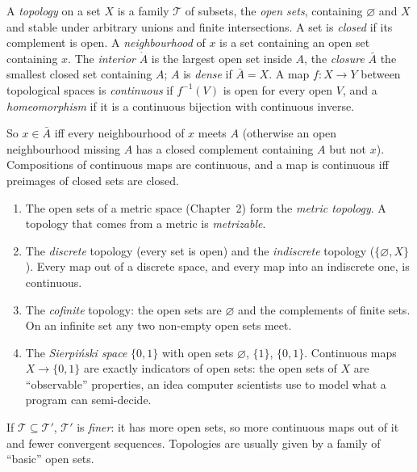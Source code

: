 \begin{definition}
A \emph{topology} on a set $X$ is a family $\mathcal T$ of subsets, the \emph{open sets}, containing $\varnothing$ and $X$ and stable under arbitrary unions
and finite intersections. A set is \emph{closed} if its complement is open. A \emph{neighbourhood} of $x$ is a set containing an open set
containing $x$. The \emph{interior} $\mathring A$ is the largest open set inside $A$, the \emph{closure} $\bar A$ the smallest closed set containing $A$; $A$ is
\emph{dense} if $\bar A=X$. A map $f:X\to Y$ between topological spaces is \emph{continuous} if $f^{-1}(V)$ is open for every open $V$, and a
\emph{homeomorphism} if it is a continuous bijection with continuous inverse.
\end{definition}

So $x\in\bar A$ iff every neighbourhood of $x$ meets $A$ (otherwise an open neighbourhood missing $A$ has a closed complement containing $A$
but not $x$). Compositions of continuous maps are continuous, and a map is continuous iff preimages of closed sets are closed.

\begin{example}\label{ex:topologies}
\begin{enumerate}[label=(\alph*)]
\item The open sets of a metric space (Chapter~2) form the \emph{metric topology}. A topology that comes from a metric is \emph{metrizable}.
\item The \emph{discrete} topology (every set is open) and the \emph{indiscrete} topology ($\{\varnothing,X\}$). Every map out of a discrete space, and every map into an
indiscrete one, is continuous.
\item The \emph{cofinite} topology: the open sets are $\varnothing$ and the complements of finite sets. On an infinite set any two non-empty open sets
meet.
\item The \emph{Sierpi\'nski space} $\{0,1\}$ with open sets $\varnothing$, $\{1\}$, $\{0,1\}$. Continuous maps $X\to\{0,1\}$ are exactly indicators of open sets: the
open sets of $X$ are ``observable'' properties, an idea computer scientists use to model what a program can semi-decide.
\end{enumerate}
\end{example}

If $\mathcal T\subseteq\mathcal T'$, $\mathcal T'$ is \emph{finer}: it has more open sets, so more continuous maps out of it and fewer convergent sequences. Topologies are
usually given by a family of ``basic'' open sets.

